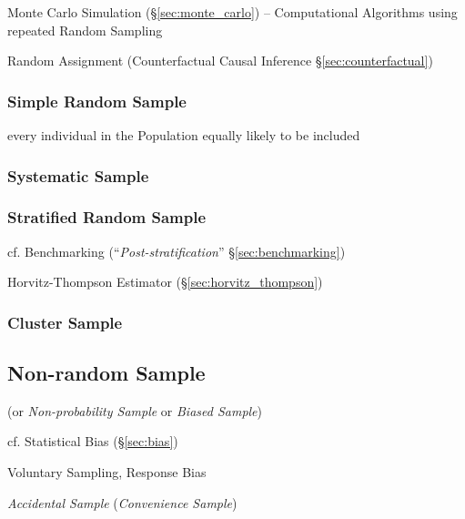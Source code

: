 \fist Monte Carlo Simulation (\S\ref{sec:monte_carlo}) -- Computational
Algorithms using repeated Random Sampling

\fist Random Assignment (Counterfactual Causal Inference
\S\ref{sec:counterfactual})



\subsubsection{Simple Random Sample}\label{sec:simple_random_sample}

every individual in the Population equally likely to be included



\subsubsection{Systematic Sample}\label{sec:systematic_sample}

\subsubsection{Stratified Random Sample}\label{sec:stratified_sample}

cf. Benchmarking (``\emph{Post-stratification}'' \S\ref{sec:benchmarking})

Horvitz-Thompson Estimator (\S\ref{sec:horvitz_thompson})



\subsubsection{Cluster Sample}\label{sec:cluster_sample}



\subsection{Non-random Sample}\label{sec:nonrandom_sample}

(or \emph{Non-probability Sample} or \emph{Biased Sample})

cf. Statistical Bias (\S\ref{sec:bias})

Voluntary Sampling, Response Bias

\emph{Accidental Sample} (\emph{Convenience Sample})

